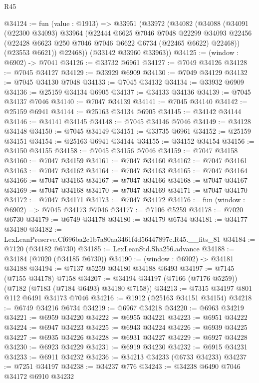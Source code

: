\begin{lexlean}{R45}
\begin{coremodule}
{@34124 := fun (value : @1913) =>
  @33951
    (@33972
      (@34082
        (@34088
          (@34091
            (@22300 @34093)
            @33964
            (@22444
              @6625
              @7046
              @7048
              @22299
              @34093
              @22456
              (@22428 @6623 @250 @7046 @7046 @6622 @6734 (@22465 @6622) @22468))
            (@23553 @6621))
          @22468))
      (@33142 @33960 @33963))
@34125 := (window : @6902) -> @7041
@34126 := @33732 @6961
@34127 := @7049 @34126
@34128 := @7045 @34127
@34129 := @33929 @6909
@34130 := @7049 @34129
@34132 := @7045 @34130 @7048
@34133 := @7045 @34132
@34134 := @33932 @6909
@34136 := @25159 @34134 @6905
@34137 := @34133 @34136
@34139 := @7045 @34137 @7046
@34140 := @7047 @34139
@34141 := @7045 @34140
@34142 := @25159 @6941
@34144 := @25163 @34134 @6905
@34145 := @34142 @34144
@34146 := @34141 @34145
@34148 := @7045 @34146 @7046
@34149 := @34128 @34148
@34150 := @7045 @34149
@34151 := @33735 @6961
@34152 := @25159 @34151
@34154 := @25163 @6941 @34144
@34155 := @34152 @34154
@34156 := @34150 @34155
@34158 := @7045 @34156 @7046
@34159 := @7047 @34158
@34160 := @7047 @34159
@34161 := @7047 @34160
@34162 := @7047 @34161
@34163 := @7047 @34162
@34164 := @7047 @34163
@34165 := @7047 @34164
@34166 := @7047 @34165
@34167 := @7047 @34166
@34168 := @7047 @34167
@34169 := @7047 @34168
@34170 := @7047 @34169
@34171 := @7047 @34170
@34172 := @7047 @34171
@34173 := @7047 @34172
@34176 := fun (window : @6902) => @7045 @34173 @7046
@34177 := @7106 @5259
@34178 := @7020 @6730
@34179 := @6749 @34178
@34180 := @34179 @6734
@34181 := @34177 @34180
@34182 := LexLeanPreserve.Cf696ba2c1b7a80aa3461f4d56447897c.R45.__fits_81
@34184 := @7120 (@34182 @6730)
@34185 := LexLeanStd.Sha256.advance
@34188 := @34184 (@7020 (@34185 @6730))
@34190 := (window : @6902) -> @34181 @34188
@34194 := @7137 @5259 @34180 @34188 @6493
@34197 := @7145 (@7155 @34178) @7158
@34207 := @34194 @34197 (@7166 (@7176 @5259)) (@7182 (@7183 (@7184 @6493) @34180 @7158))
@34213 := @7315 @34197 @801 @112 @6491 @34173 @7046
@34216 := @1912 (@25163 @34151 @34154)
@34218 := @6749 @34216 @6734
@34219 := @6967 @34218
@34220 := @6963 @34219
@34221 := @6959 @34220
@34222 := @6955 @34221
@34223 := @6951 @34222
@34224 := @6947 @34223
@34225 := @6943 @34224
@34226 := @6939 @34225
@34227 := @6935 @34226
@34228 := @6931 @34227
@34229 := @6927 @34228
@34230 := @6923 @34229
@34231 := @6919 @34230
@34232 := @6915 @34231
@34233 := @6911 @34232
@34236 := @34213 @34233 (@6733 @34233)
@34237 := @7251 @34197
@34238 := @34237 @776
@34243 := @34238 @6490 @7046 @34172 @6910 @34232
}
\end{coremodule}
\end{lexlean}
